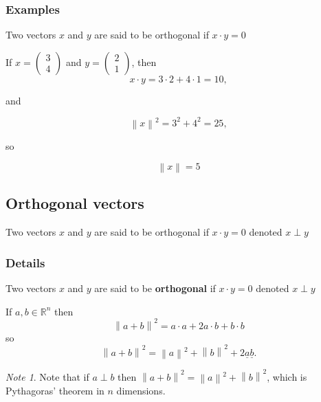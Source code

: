 \documentclass[12pt,a4paper]{article}
\theoremstyle{regla}
\theoremstyle{remark}
\newtheorem{notes}{Note}[section]
\theoremstyle{definition}
\theoremstyle{nonumberbreak}
\begin{document}
\subsubsection{Examples}
Two vectors $x$ and $y$ are said to be orthogonal if $x \cdot y = 0$

\begin{xmpl}

If $ x= \begin{pmatrix}
3\\
4
\end{pmatrix}$ and $y= \begin{pmatrix}
2\\
1
\end{pmatrix}$, then $$x \cdot y = 3 \cdot 2 + 4 \cdot 1 = 10,$$

and

$$\left \| x \right \|^2 = 3^2 + 4^2 = 25,$$

so

$$\left\| x \right \| = 5$$

\end{xmpl}

\subsection{Orthogonal vectors}
\begin{fbox}
\begin{minipage}{0.97\textwidth}
Two vectors $x$ and $y$ are said to be orthogonal if $x\cdot y=0$ denoted $x \perp y$
\end{minipage}
\end{fbox}
\subsubsection{Details}
\begin{defn}
Two vectors $x$ and $y$ are said to be {\bf orthogonal} if $x\cdot y=0$ denoted $x \perp y$
\end{defn}

If $a,b \in \mathbb{R}^n$ then 
$$\left\|a+b\right\|^2=a\cdot a+2a\cdot b+b\cdot b$$
so 
$$\left\|a+b\right\|^2=\left\|a\right\|^2+\left\|b\right\|^2 + 2\underline{a}\underline{b}.$$
\begin{notes}
Note that if $a \perp b$ then $\left\|a+b\right\|^2=\left\|a\right\|^2+ \left\|b\right\|^2$, which is Pythagoras' theorem in $n$ dimensions.
\end{notes}
\end{document}
